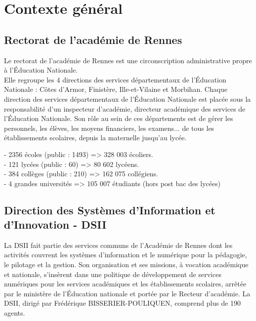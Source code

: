 \documentclass[12pt]{article}
\begin{document}
\newpage


   

\section{Contexte général}
\subsection{Rectorat de l’académie de Rennes}

Le rectorat de l'académie de Rennes est une circonscription administrative propre à l’Éducation Nationale.\\
Elle regroupe les 4 directions des services départementaux de l'Éducation Nationale : 
Côtes d'Armor, Finistère, Ille-et-Vilaine et Morbihan. Chaque direction des services départementaux de l'Éducation Nationale est placée sous la responsabilité d'un inspecteur d'académie, directeur académique des services de l'Éducation Nationale. Son rôle au sein de ces départements est de gérer les personnels, les élèves, les moyens financiers, les examens... de tous les établissements scolaires, depuis la maternelle jusqu'au lycée.


- 2356 écoles (public : 1493) => 328 003 écoliers.\\


- 121 lycées (public : 60) => 80 602 lycéens.\\


- 384 collèges (public : 210) => 162 075 collégiens.\\

- 4 grandes universités => 105 007 étudiants (hors post bac des lycées)\\

\subsection{Direction des Systèmes d'Information et d'Innovation - DSII }


La DSII fait partie des services communs de l’Académie de Rennes dont les activités couvrent les systèmes d’information et le numérique pour la pédagogie, le pilotage et la gestion.
Son organisation et ses missions, à vocation académique et nationale, s’insèrent dans une politique de développement de services numériques pour les services académiques et les établissements scolaires, arrêtée par le ministère de l’Éducation nationale et portée par le Recteur d’académie.
La DSII, dirigé par Frédérique BISSERIER-POULIQUEN, comprend plus de 190 agents.
\end{document}
